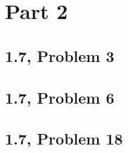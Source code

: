 \documentclass[10pt]{mypackage}
\begin{document}
\section{Part 2}%
\subsection{1.7, Problem 3}%
\subsection{1.7, Problem 6}%
\subsection{1.7, Problem 18}%
\end{document}
